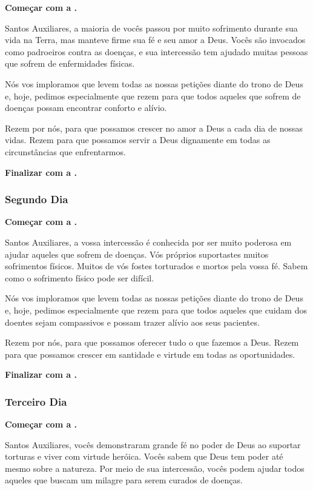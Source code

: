 \documentclass[a4paper,12pt]{extarticle} \usepackage[utf8]{inputenc}
\begin{document}
\textbf{Começar com a .}

Santos Auxiliares, a maioria de vocês passou por muito sofrimento durante sua vida na Terra, mas manteve firme sua fé e seu amor a Deus. Vocês são invocados como padroeiros contra as doenças, e sua intercessão tem ajudado muitas pessoas que sofrem de enfermidades físicas.

Nós vos imploramos que levem todas as nossas petições diante do trono de Deus e, hoje, pedimos especialmente que rezem para que todos aqueles que sofrem de doenças possam encontrar conforto e alívio.

Rezem por nós, para que possamos crescer no amor a Deus a cada dia de nossas vidas. Rezem para que possamos servir a Deus dignamente em todas as circunstâncias que enfrentarmos.


\textbf{Finalizar com a .}


\subsubsection{Segundo Dia}

\textbf{Começar com a .}


Santos Auxiliares, a vossa intercessão é conhecida por ser muito poderosa em ajudar aqueles que sofrem de doenças. Vós próprios suportastes muitos sofrimentos físicos. Muitos de vós fostes torturados e mortos pela vossa fé. Sabem como o sofrimento físico pode ser difícil.

Nós vos imploramos que levem todas as nossas petições diante do trono de Deus e, hoje, pedimos especialmente que rezem para que todos aqueles que cuidam dos doentes sejam compassivos e possam trazer alívio aos seus pacientes.

Rezem por nós, para que possamos oferecer tudo o que fazemos a Deus. Rezem para que possamos crescer em santidade e virtude em todas as oportunidades.


\textbf{Finalizar com a .}


\subsubsection{Terceiro Dia}

\textbf{Começar com a .}


Santos Auxiliares, vocês demonstraram grande fé no poder de Deus ao suportar torturas e viver com virtude heróica. Vocês sabem que Deus tem poder até mesmo sobre a natureza. Por meio de sua intercessão, vocês podem ajudar todos aqueles que buscam um milagre para serem curados de doenças.
\end{document}
